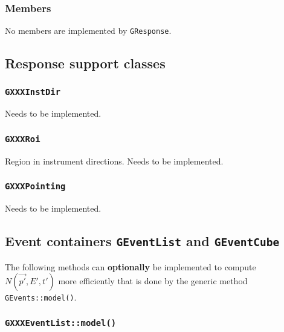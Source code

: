 \documentclass{article}[12pt,a4]
\begin{document}
\subsubsection{Members}

No members are implemented by {\tt GResponse}.


\subsection{Response support classes}

\subsubsection{{\tt GXXXInstDir}}
\label{sec:GInstDir}

Needs to be implemented.


\subsubsection{{\tt GXXXRoi}}
\label{sec:GRoi}

Region in instrument directions.
Needs to be implemented.


\subsubsection{{\tt GXXXPointing}}
\label{sec:GPointing}

Needs to be implemented.


\subsection{Event containers {\tt GEventList} and {\tt GEventCube}}
\label{sec:GEvents}

The following methods can {\bf optionally} be implemented to compute $N(\vec{p'}, E', t')$
more efficiently that is done by the generic method {\tt GEvents::model()}.

\subsubsection{{\tt GXXXEventList::model()}}
\end{document}
